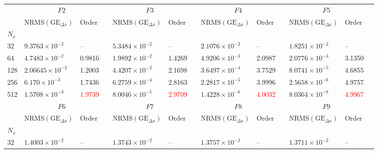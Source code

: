 \documentclass[11pt,titlepage]{report}
\newcommand{\ra}[1]{\renewcommand{\arraystretch}{#1}}
\begin{document}
\begin{landscape}
\begin{table}\centering
\ra{1.4}
\begin{tabular}{@{}lllcllcllclll@{}}\toprule[2 pt]
&\multicolumn{2}{c}{$F2$} & \phantom{abc} & \multicolumn{2}{c}{$F3$} &
\phantom{abc} & \multicolumn{2}{c}{$F4$} & \phantom{abc} & \multicolumn{2}{c}{$F5$} \\
\cmidrule{2-3} \cmidrule{5-6} \cmidrule{8-9} \cmidrule{11-12}  
& $\text{NRMS}(\text{GE}_{\Delta x})$ & Order && $\text{NRMS}(\text{GE}_{\Delta x})$ & Order && $\text{NRMS}(\text{GE}_{\Delta x})$ & Order  && $\text{NRMS}(\text{GE}_{\Delta x})$ & Order & \\ 
\midrule
\phantom{a}$N_x$ \\
\phantom{a}32	&	$9.3763\times 10^{-2}$	&	--	                 	&&	$5.3484\times 10^{-2}$	&	--               		&&	$2.1076\times 10^{-2}$	&	--              		&&	$1.8251\times 10^{-2}$	&	--	\\
\phantom{a}64	&	$4.7483\times 10^{-2}$	&	0.9816	                 	&&	$1.9892\times 10^{-2}$	&	1.4269           		&&	$4.9206\times 10^{-3}$	&	2.0987            		&&	$2.0776\times 10^{-3}$	&	3.1350	\\
\phantom{a}128	&	$2.06645\times 10^{-2}$	&	1.2003	                	&&	$4.4207\times 10^{-2}$	&	2.1698		                &&	$3.6497\times 10^{-4}$	&	3.7529            		&&	$8.0741\times 10^{-5}$	&	4.6855	\\
\phantom{a}256	&	$6.170\times 10^{-3}$	&	1.7436           		&&	$6.2759\times 10^{-4}$	&	2.8163          		&&	$2.2817\times 10^{-5}$	&	3.9996          		&&	$2.5658\times 10^{-6}$	&	4.9757	\\
\phantom{a}512	&	$1.5708\times 10^{-3}$	&	\textcolor{red}{1.9739}		&&	$8.0046\times 10^{-5}$	&	\textcolor{red}{2.9709}		&&	$1.4228\times 10^{-6}$	&	\textcolor{red}{4.0032}		&&	$8.0364\times 10^{-8}$	&	\textcolor{red}{4.9967}	\\
\midrule
&\multicolumn{2}{c}{$F6$} & \phantom{abc} & \multicolumn{2}{c}{$F7$} &
\phantom{abc} & \multicolumn{2}{c}{$F8$} & \phantom{abc} & \multicolumn{2}{c}{$F9$} \\
\cmidrule{2-3} \cmidrule{5-6} \cmidrule{8-9} \cmidrule{11-12}  
& $\text{NRMS}(\text{GE}_{\Delta x})$ & Order && $\text{NRMS}(\text{GE}_{\Delta x})$ & Order && $\text{NRMS}(\text{GE}_{\Delta x})$ & Order  && $\text{NRMS}(\text{GE}_{\Delta x})$ & Order & \\
\midrule
\phantom{a}$N_x$ \\
\phantom{a}32	&	$1.4003\times 10^{-2}$	&	--              		&&	$1.3743\times 10^{-2}$	&	--                 		&&	$1.3757\times 10^{-2}$	&	--	                	&&	$1.3711\times 10^{-2}$	&	--	\\

\end{tabular}
\end{table}
\end{landscape}
\end{document}
